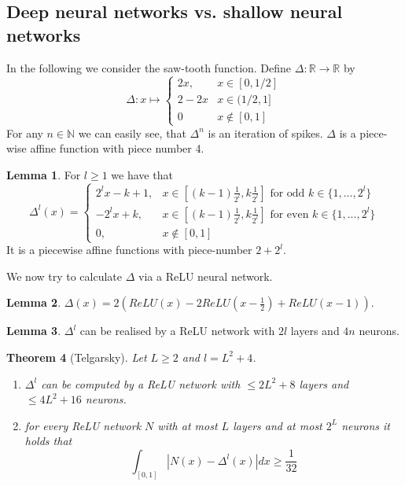 \documentclass[a4paper, 12pt]{article}
\theoremstyle{plain}
\newtheorem{theorem}{Theorem}[subsection] %
\theoremstyle{definition}
\theoremstyle{lemma}
\newtheorem{lemma}[theorem]{Lemma}
\theoremstyle{remark}
\theoremstyle{example}
\begin{document}
	\subsection{Deep neural networks vs. shallow neural networks}
	In the following we consider the saw-tooth function. Define $\Delta: \mathbb{R} \to \mathbb{R}$ by \[\Delta: x \mapsto \begin{cases}
		2x, & x \in [0,1/2]\\
		2-2x & x \in (1/2, 1]\\
		0 & x \notin [0,1]
	\end{cases}\]
	For any $n \in \mathbb{N}$ we can easily see, that $\Delta^n$ is an iteration of spikes. $\Delta$ is a piece-wise affine function with piece number 4.
	\begin{lemma}
		For $l \geq 1$ we have that $$\Delta^l(x) = \begin{cases}
			2^lx-k+1, & x \in [(k-1)\frac{1}{2^l},k\frac{1}{2^l}] \text{ for odd } k\in\{1,...,2^l\}\\
			-2^lx+k, & x \in [(k-1)\frac{1}{2^l},k\frac{1}{2^l}] \text{ for even } k \in \{1,...,2^l\}\\
			0, & x \notin [0,1]
		\end{cases}$$
		It is a piecewise affine functions with piece-number $2+2^l$.
	\end{lemma}
	We now try to calculate $\Delta$ via a ReLU neural network.
	\begin{lemma}
		$\Delta(x) = 2(ReLU(x)-2ReLU(x-\frac{1}{2})+ReLU(x-1))$.
	\end{lemma}
	\begin{lemma}
		$\Delta^l$ can be realised by a ReLU network with $2l$ layers and $4n$ neurons.
	\end{lemma}
	\begin{theorem}[Telgarsky]
		Let $L\geq 2$ and $l=L^2+4$.
		\begin{enumerate}
			\item $\Delta^l$ can be computed by a ReLU network with $\leq 2L^2+8$ layers and $\leq 4L^2 + 16$ neurons.
			\item for every ReLU network $N$ with at most $L$ layers and at most $2^L$ neurons it holds that \[\int_{[0,1]} \left|N(x)-\Delta^l(x)\right| dx \geq \frac{1}{32}\]
		\end{enumerate}
	\end{theorem}
\end{document}

